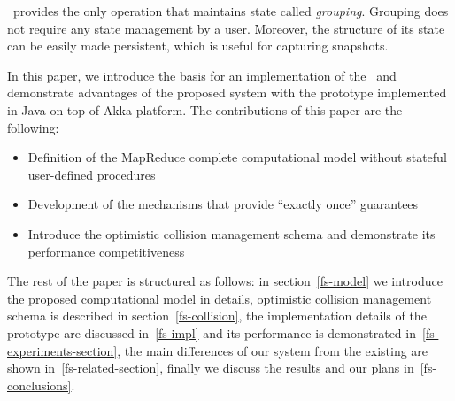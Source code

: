 \FlameStream\ provides the only operation that maintains state called {\it grouping}. Grouping does not require any state management by a user. Moreover, the structure of its state can be easily made persistent, which is useful for capturing snapshots.

In this paper, we introduce the basis for an implementation of the \FlameStream\ and demonstrate advantages of the proposed system with the prototype implemented in Java on top of Akka platform. The contributions of this paper are the following:

\begin {itemize}
\item Definition of the MapReduce complete computational model without stateful user-defined procedures
\item Development of the mechanisms that provide ``exactly once'' guarantees
\item Introduce the optimistic collision management schema and demonstrate its performance competitiveness
\end {itemize}

The rest of the paper is structured as follows: in section~\ref{fs-model} we introduce the proposed computational model in details, optimistic collision management schema is described in section~\ref{fs-collision}, the implementation details of the prototype are discussed in~\ref{fs-impl} and its performance is demonstrated in~\ref{fs-experiments-section}, the main differences of our system from the existing are shown in~\ref{fs-related-section}, finally we discuss the results and our plans in~\ref{fs-conclusions}.

\endinput
